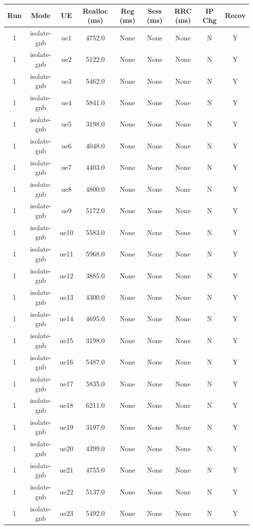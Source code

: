 \begin{table}[ht]
\centering
\begin{tabular}{|c|c|c|c|c|c|c|c|c|}
\hline
Run & Mode & UE & Realloc (ms) & Reg (ms) & Sess (ms) & RRC (ms) & IP Chg & Recov \\
\hline
1 & isolate-gnb & ue1 & 4752.0 & None & None & None & N & Y \\
1 & isolate-gnb & ue2 & 5122.0 & None & None & None & N & Y \\
1 & isolate-gnb & ue3 & 5462.0 & None & None & None & N & Y \\
1 & isolate-gnb & ue4 & 5841.0 & None & None & None & N & Y \\
1 & isolate-gnb & ue5 & 3198.0 & None & None & None & N & Y \\
1 & isolate-gnb & ue6 & 4048.0 & None & None & None & N & Y \\
1 & isolate-gnb & ue7 & 4403.0 & None & None & None & N & Y \\
1 & isolate-gnb & ue8 & 4800.0 & None & None & None & N & Y \\
1 & isolate-gnb & ue9 & 5172.0 & None & None & None & N & Y \\
1 & isolate-gnb & ue10 & 5583.0 & None & None & None & N & Y \\
1 & isolate-gnb & ue11 & 5968.0 & None & None & None & N & Y \\
1 & isolate-gnb & ue12 & 3885.0 & None & None & None & N & Y \\
1 & isolate-gnb & ue13 & 4300.0 & None & None & None & N & Y \\
1 & isolate-gnb & ue14 & 4695.0 & None & None & None & N & Y \\
1 & isolate-gnb & ue15 & 3198.0 & None & None & None & N & Y \\
1 & isolate-gnb & ue16 & 5487.0 & None & None & None & N & Y \\
1 & isolate-gnb & ue17 & 5835.0 & None & None & None & N & Y \\
1 & isolate-gnb & ue18 & 6211.0 & None & None & None & N & Y \\
1 & isolate-gnb & ue19 & 3197.0 & None & None & None & N & Y \\
1 & isolate-gnb & ue20 & 4399.0 & None & None & None & N & Y \\
1 & isolate-gnb & ue21 & 4755.0 & None & None & None & N & Y \\
1 & isolate-gnb & ue22 & 5137.0 & None & None & None & N & Y \\
1 & isolate-gnb & ue23 & 5492.0 & None & None & None & N & Y \\

\end{tabular}
\end{table}
